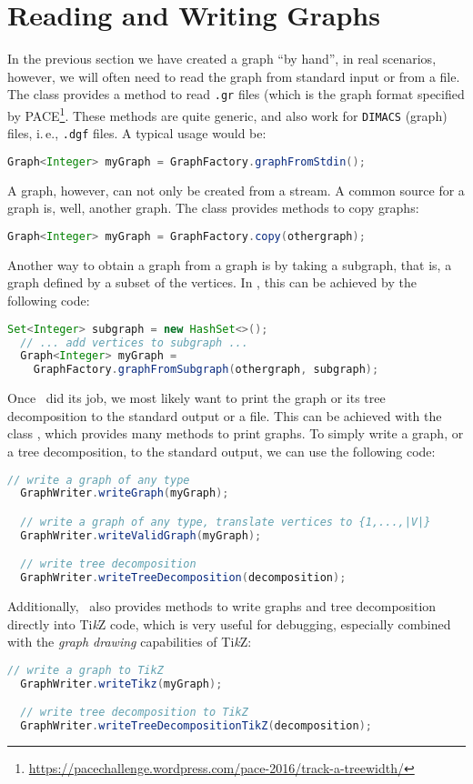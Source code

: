 \documentclass[a4paper, ukenglish, twoside, openright]{jdrasilmanual}
\begin{document}
\section{Reading and Writing Graphs}
In the previous section we have created a graph ``by hand'', in real
scenarios, however, we will often need to read the graph from
standard input or from a file. The class 
provides a method to read \texttt{.gr} files (which is the graph format
specified by
PACE\footnote{\url{https://pacechallenge.wordpress.com/pace-2016/track-a-treewidth/}}. These
methods are quite generic, and also work for \texttt{DIMACS} (graph)
files, i.\,e., \texttt{.dgf} files. A typical usage would be:
\begin{lstlisting}[language=Java]
  Graph<Integer> myGraph = GraphFactory.graphFromStdin();
\end{lstlisting}
A graph, however, can not only be created from a stream. A common
source for a graph is, well, another graph. The  class
provides methods to copy graphs:
\begin{lstlisting}[language=Java]
  Graph<Integer> myGraph = GraphFactory.copy(othergraph);
\end{lstlisting}
Another way to obtain a graph from a graph is by taking a subgraph,
that is, a graph defined by a subset of the vertices. In \Jdrasil,
this can be achieved by the following code:
\begin{lstlisting}[language=Java]
  Set<Integer> subgraph = new HashSet<>();
  // ... add vertices to subgraph ...
  Graph<Integer> myGraph = 
    GraphFactory.graphFromSubgraph(othergraph, subgraph);
\end{lstlisting}

Once \Jdrasil\ did its job, we most likely want to print the graph or
its tree decomposition to the standard output or a file. This can be
achieved with the class , which provides many
methods to print graphs. To simply write a graph, or a tree
decomposition, to the standard output, we can use the following code:
\begin{lstlisting}[language=Java]
  // write a graph of any type
  GraphWriter.writeGraph(myGraph);

  // write a graph of any type, translate vertices to {1,...,|V|}
  GraphWriter.writeValidGraph(myGraph);

  // write tree decomposition
  GraphWriter.writeTreeDecomposition(decomposition);
\end{lstlisting}
Additionally, \Jdrasil\ also provides methods to write graphs and tree
decomposition directly into Ti\emph{k}Z code, which is very useful for
debugging, especially combined with the \emph{graph drawing}
capabilities of Ti\emph{k}Z:
\begin{lstlisting}[language=Java]
  // write a graph to TikZ
  GraphWriter.writeTikz(myGraph);

  // write tree decomposition to TikZ
  GraphWriter.writeTreeDecompositionTikZ(decomposition);
\end{lstlisting}
\end{document}

